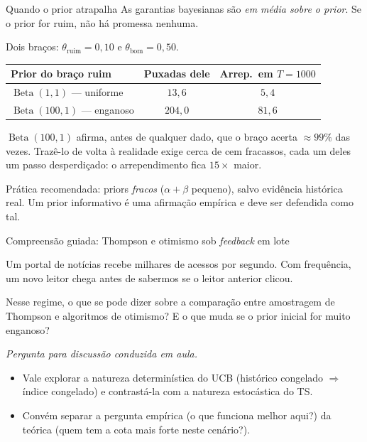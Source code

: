 \documentclass[aspectratio=169, 11pt]{beamer}
\newcommand{\paradiscussao}{\smallskip
  {\footnotesize\color{rlCinza}\itshape Pergunta para discussão conduzida em aula.}}
\newcommand{\Bdist}{\operatorname{Beta}}
\begin{document}
\begin{frame}{Quando o prior atrapalha}
  As garantias bayesianas são \emph{em média sobre o prior}. Se o prior for
  ruim, não há promessa nenhuma.

  \smallskip
  \begin{center}\small
  Dois braços: $\theta_{\text{ruim}} = 0{,}10$ e $\theta_{\text{bom}} = 0{,}50$.

  \smallskip
  \begin{tabular}{@{}lcc@{}}
    \toprule
    \textbf{Prior do braço ruim} & \textbf{Puxadas dele} &
      \textbf{Arrep.\ em $T = 1000$} \\
    \midrule
    $\Bdist(1,1)$ — uniforme   & $13{,}6$  & $5{,}4$ \\
    $\Bdist(100,1)$ — enganoso & $204{,}0$ & $81{,}6$ \\
    \bottomrule
  \end{tabular}
  \end{center}

  \begin{alertabox}
    $\Bdist(100,1)$ afirma, antes de qualquer dado, que o braço acerta
    $\approx 99\%$ das vezes. Trazê-lo de volta à realidade exige cerca de
    cem fracassos, cada um deles um passo desperdiçado: o arrependimento
    fica $15\times$ maior.
  \end{alertabox}

  \smallskip
  {\small\color{rlCinza} Prática recomendada: priors \emph{fracos}
  ($\alpha+\beta$ pequeno), salvo evidência histórica real. Um prior
  informativo é uma afirmação empírica e deve ser defendida como tal.}
\end{frame}

\begin{frame}{Compreensão guiada: Thompson e otimismo sob \emph{feedback} em lote}
  \begin{quizbox}{}
    Um portal de notícias recebe milhares de acessos por segundo. Com
    frequência, um novo leitor chega \alert{antes} de sabermos se o leitor
    anterior clicou.

    \smallskip
    Nesse regime, o que se pode dizer sobre a comparação entre amostragem
    de Thompson e algoritmos de otimismo? E o que muda se o prior inicial
    for muito enganoso?
  \end{quizbox}
  \paradiscussao

  \medskip
  \begin{itemize}
    \item Vale explorar a natureza \alert{determinística} do UCB (histórico
          congelado $\Rightarrow$ índice congelado) e contrastá-la com a
          natureza \alert{estocástica} do TS.
    \item Convém separar a pergunta empírica (o que funciona melhor aqui?)
          da teórica (quem tem a cota mais forte neste cenário?).
  \end{itemize}
\end{frame}
\end{document}
